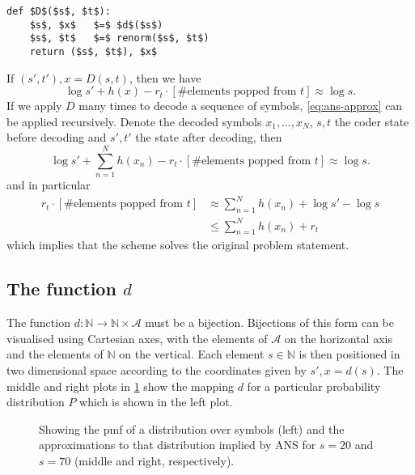\documentclass{article}
\begin{document}
\begin{lstlisting}
def $D$($s$, $t$):
    $s$, $x$   $=$ $d$($s$)
    $s$, $t$   $=$ renorm($s$, $t$)
    return ($s$, $t$), $x$
\end{lstlisting}
If $(s', t'), x = D(s, t)$, then we have
\begin{equation}\label{eq:ans-approx}
        \log s' + h(x) - r_t\cdot\left[\text{\# elements popped from $t$}\right]
        \approx \log s.
\end{equation}
If we apply $D$ many times to decode a sequence of symbols,
\cref{eq:ans-approx} can be applied recursively. Denote the decoded symbols
$x_1, \ldots, x_N$, $s, t$ the coder state before decoding and $s', t'$ the
state after decoding, then
\begin{equation}
        \log s' + \sum_{n=1}^Nh(x_n) - r_t\cdot\left[\text{\# elements popped
        from $t$}\right] \approx \log s.
\end{equation}
and in particular
\begin{align}
         r_t\cdot\left[\text{\# elements popped
         from $t$}\right] &\approx \sum_{n=1}^Nh(x_n) + \log s' - \log s\\
                          &\leq \sum_{n=1}^Nh(x_n) + r_t
\end{align}
which implies that the scheme solves the original problem statement.

\subsection*{The function $d$}\label{sec:inner-decoder}
The function $d:\mathbb{N}\rightarrow\mathbb{N}\times\mathcal{A}$ must be a
bijection. Bijections of this form can be visualised using Cartesian axes, with
the elements of $\mathcal{A}$ on the horizontal axis and the elements of
$\mathbb{N}$ on the vertical. Each element $s\in\mathbb{N}$ is then positioned
in two dimensional space according to the coordinates given by $s', x = d(s)$.
The middle and right plots in \cref{fig:visual-ans} show the mapping $d$ for a
particular probability distribution $P$ which is shown in the left plot.
\begin{figure}[t]
  \centering
  \drawpmf \quad {} \quad {}
  \caption{
    Showing the pmf of a distribution over symbols (left) and the
    approximations to that distribution implied by ANS for $s=20$ and $s=70$
    (middle and right, respectively).}\label{fig:visual-ans}
\end{figure}
\end{document}
